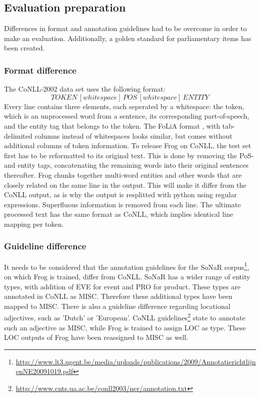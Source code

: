 \subsection{Evaluation preparation}\label{subsec:eval_prep}
Differences in format and annotation guidelines had to be overcome in order to make an evaluation. 
Additionally, a golden standard for parliamentary items has been created.
\subsubsection{Format difference}
The CoNLL-2002 data set uses the following format: $$TOKEN\,[whitespace]\,POS\,[whitespace]\,ENTITY$$ Every line contains three elements, each seperated by a whitespace: the token, which is an unprocessed word from a sentence, its corresponding part-of-speech, and the entity tag that belongs to the token. The FoLiA format \cite{van2013folia}, with tab-delimited columns instead of whitespaces looks similar, but comes without additional columns of token information. To release Frog on CoNLL, the test set first has to be reformatted to its original text. This is done by removing the PoS- and entity tags, concatenating the remaining words into their original sentences thereafter.  Frog chunks together multi-word entities and other words that are closely related on the same line in the output. This will make it differ from the CoNLL output, as is why the output is resplitted with python using regular expressions. Superfluous information is removed from each line. The ultimate processed text has the same format as CoNLL, which implies identical line mapping per token.

\subsubsection{Guideline difference}
It needs to be considered that the annotation guidelines for the SoNaR corpus\footnote{\url{http://www.lt3.ugent.be/media/uploads/publications/2009/AnnotatierichtlijnenNE20091019.pdf}}, on which Frog is trained, differ from CoNLL. SoNaR has a wider range of entity types, with addition of EVE for event and PRO for product. These types are annotated in CoNLL as MISC. Therefore these additional types have been mapped to MISC. There is also a guideline difference regarding locational adjectives, such as 'Dutch' or 'European'. CoNLL guidelines\footnote{\url{http://www.cnts.ua.ac.be/conll2003/ner/annotation.txt}} state to annotate such an adjective as MISC, while Frog is trained to assign LOC as type. These LOC outputs of Frog have been reassigned to MISC as well.

